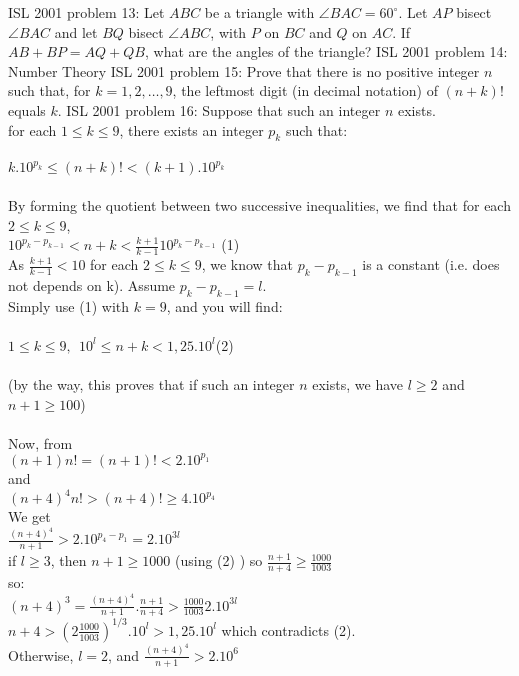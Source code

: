ISL 2001 problem 13:  Let $ABC$ be a triangle with $\angle BAC = 60^{\circ}$. Let $AP$ bisect $\angle BAC$ and let $BQ$ bisect  $\angle ABC$, with $P$ on $BC$ and $Q$ on $AC$. If $AB + BP = AQ + QB$, what are the angles of the triangle? 
ISL 2001 problem 14:  Number Theory 
ISL 2001 problem 15:  Prove that there is no positive integer $n$ such that, for $k = 1,2,\ldots,9$, the leftmost digit (in decimal notation) of $(n+k)!$ equals $k$. 
ISL 2001 problem 16:  Suppose that such an integer $n$ exists. \\
for each $1\leq k\leq 9$, there exists an integer $p_k$ such that: \\\\
$k.10^{p_k}\leq  (n+k)! < (k+1).10^{p_k}$ \\\\
By forming the quotient between two successive inequalities, we find that for each $2\leq k \leq 9$, \\
$10^{p_k-p_{k-1}}<n+k<\frac{k+1}{k-1}10^{p_k-p_{k-1}}$ (1) \\
As $\frac{k+1}{k-1}<10$ for each $2\leq k \leq 9$, we know that $p_k-p_{k-1}$ is a constant (i.e. does not depends on k). Assume $p_k-p_{k-1}=l$. \\
Simply use (1) with $k=9$, and you will find: \\\\
$%
1\leq k \leq 9, \ \ 10^l\leq n+k<1,25.10^l$(2) \\\\
(by the way, this proves that if such an integer $n$ exists, we have $l\geq 2$ and $n+1\geq 100$) \\\\
Now, from \\
$(n+1)n!=(n+1)!<2.10^{p_1}$ \\
and \\
$(n+4)^4n!>(n+4)!\geq 4.10^{p_4}$ \\
We get \\
$\frac{(n+4)^4}{n+1}>2.10^{p_4-p_1}=2.10^{3l}$ \\
if $l\geq 3$, then $n+1\geq 1000$ (using (2) ) so $\frac{n+1}{n+4}\geq \frac{1000}{1003}$ \\
so: \\
$(n+4)^3=\frac{(n+4)^4}{n+1}.\frac{n+1}{n+4}>\frac{1000}{1003}2.10^{3l}$ \\
$n+4>\left(2\frac{1000}{1003}\right)^{1/3}.10^l>1,25.10^l$ which contradicts (2). \\
Otherwise, $l=2$, and $\frac{(n+4)^4}{n+1}>2.10^6$ \\
